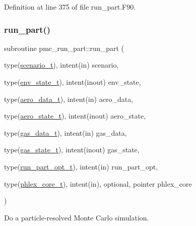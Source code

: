 Definition at line 375 of file run\+\_\+part.\+F90.

\mbox{\label{namespacepmc__run__part_af2f5c765b1f86663d85b7ca882325eca}} 
\subsubsection{\texorpdfstring{run\+\_\+part()}{run\_part()}}
{\footnotesize\ttfamily subroutine pmc\+\_\+run\+\_\+part\+::run\+\_\+part (\begin{DoxyParamCaption}\item[{type(\mbox{\hyperlink{structpmc__scenario_1_1scenario__t}{scenario\+\_\+t}}), intent(in)}]{scenario,  }\item[{type(\mbox{\hyperlink{structpmc__env__state_1_1env__state__t}{env\+\_\+state\+\_\+t}}), intent(inout)}]{env\+\_\+state,  }\item[{type(\mbox{\hyperlink{structpmc__aero__data_1_1aero__data__t}{aero\+\_\+data\+\_\+t}}), intent(in)}]{aero\+\_\+data,  }\item[{type(\mbox{\hyperlink{structpmc__aero__state_1_1aero__state__t}{aero\+\_\+state\+\_\+t}}), intent(inout)}]{aero\+\_\+state,  }\item[{type(\mbox{\hyperlink{structpmc__gas__data_1_1gas__data__t}{gas\+\_\+data\+\_\+t}}), intent(in)}]{gas\+\_\+data,  }\item[{type(\mbox{\hyperlink{structpmc__gas__state_1_1gas__state__t}{gas\+\_\+state\+\_\+t}}), intent(inout)}]{gas\+\_\+state,  }\item[{type(\mbox{\hyperlink{structpmc__run__part_1_1run__part__opt__t}{run\+\_\+part\+\_\+opt\+\_\+t}}), intent(in)}]{run\+\_\+part\+\_\+opt,  }\item[{type(\mbox{\hyperlink{structpmc__phlex__core_1_1phlex__core__t}{phlex\+\_\+core\+\_\+t}}), intent(in), optional, pointer}]{phlex\+\_\+core }\end{DoxyParamCaption})}



Do a particle-\/resolved Monte Carlo simulation. 


